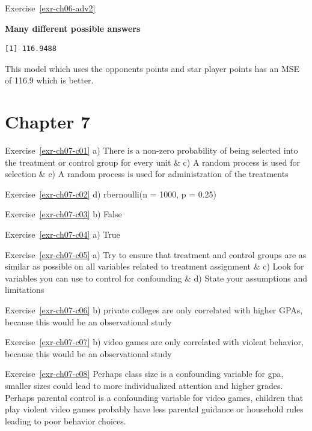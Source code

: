 \documentclass[
  letterpaper,
  DIV=11,
  numbers=noendperiod]{scrreprt}
\newenvironment{Shaded}{\begin{snugshade}}{\end{snugshade}}
\newcommand{\AttributeTok}[1]{\textcolor[rgb]{0.40,0.45,0.13}{#1}}
\newcommand{\DecValTok}[1]{\textcolor[rgb]{0.68,0.00,0.00}{#1}}
\newcommand{\FunctionTok}[1]{\textcolor[rgb]{0.28,0.35,0.67}{#1}}
\newcommand{\NormalTok}[1]{\textcolor[rgb]{0.00,0.23,0.31}{#1}}
\newcommand{\OtherTok}[1]{\textcolor[rgb]{0.00,0.23,0.31}{#1}}
\newcommand{\SpecialCharTok}[1]{\textcolor[rgb]{0.37,0.37,0.37}{#1}}
\theoremstyle{definition}
\theoremstyle{remark}
\begin{document}
Exercise~\ref{exr-ch06-adv2}

\textbf{Many different possible answers}

\begin{Shaded}
\end{Shaded}

\begin{verbatim}
[1] 116.9488
\end{verbatim}

This model which uses the opponents points and star player points has an
MSE of 116.9 which is better.

\hypertarget{sec-ex07-sol}{%
\section{Chapter 7}\label{sec-ex07-sol}}

Exercise~\ref{exr-ch07-c01} a) There is a non-zero probability of being
selected into the treatment or control group for every unit \& c) A
random process is used for selection \& e) A random process is used for
administration of the treatments

Exercise~\ref{exr-ch07-c02} d) rbernoulli(n = 1000, p = 0.25)

Exercise~\ref{exr-ch07-c03} b) False

Exercise~\ref{exr-ch07-c04} a) True

Exercise~\ref{exr-ch07-c05} a) Try to ensure that treatment and control
groups are as similar as possible on all variables related to treatment
assignment \& c) Look for variables you can use to control for
confounding \& d) State your assumptions and limitations

Exercise~\ref{exr-ch07-c06} b) private colleges are only correlated with
higher GPAs, because this would be an observational study

Exercise~\ref{exr-ch07-c07} b) video games are only correlated with
violent behavior, because this would be an observational study

Exercise~\ref{exr-ch07-c08} Perhaps class size is a confounding variable
for gpa, smaller sizes could lead to more individualized attention and
higher grades. Perhaps parental control is a confounding variable for
video games, children that play violent video games probably have less
parental guidance or household rules leading to poor behavior choices.
\end{document}
